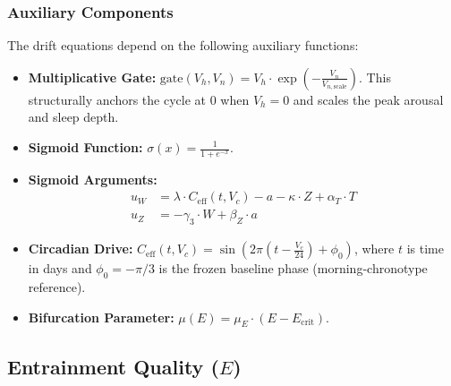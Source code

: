 \documentclass[11pt,a4paper]{article}
\begin{document}
\subsubsection*{Auxiliary Components}
The drift equations depend on the following auxiliary functions:
\begin{itemize}
    \item \textbf{Multiplicative Gate:} $\text{gate}(V_h, V_n) = V_h \cdot \exp\left(-\frac{V_n}{V_{n,\text{scale}}}\right)$. This structurally anchors the cycle at 0 when $V_h=0$ and scales the peak arousal and sleep depth.
    \item \textbf{Sigmoid Function:} $\sigma(x) = \frac{1}{1 + e^{-x}}$.
    \item \textbf{Sigmoid Arguments:}
    \begin{align*}
        u_W &= \lambda \cdot C_{\text{eff}}(t, V_c) - a - \kappa \cdot Z + \alpha_T \cdot T \\
        u_Z &= -\gamma_3 \cdot W + \beta_Z \cdot a
    \end{align*}
    \item \textbf{Circadian Drive:} $C_{\text{eff}}(t, V_c) = \sin\left(2\pi \left(t - \frac{V_c}{24}\right) + \phi_0\right)$, where $t$ is time in days and $\phi_0 = -\pi/3$ is the frozen baseline phase (morning-chronotype reference).
    \item \textbf{Bifurcation Parameter:} $\mu(E) = \mu_E \cdot (E - E_{\text{crit}})$.
\end{itemize}

\subsection{Entrainment Quality ($E$)}\label{sec:entrainment}
\end{document}
